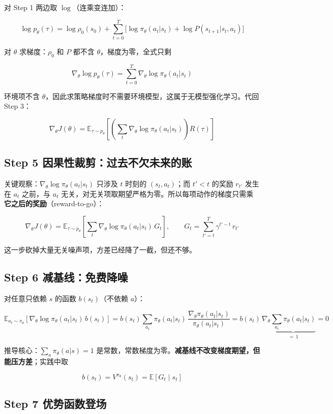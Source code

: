 \documentclass[UTF8,12pt,a4paper]{ctexrep}
\newcommand{\plain}[1]{\begin{plainbox}#1\end{plainbox}}
\begin{document}
对 Step 1 两边取 $\log$（连乘变连加）：

$$
\log p_\theta(\tau) = \log \rho_0(s_0) + \sum_{t=0}^{T}\Big[\log \pi_\theta(a_t|s_t) + \log P(s_{t+1}|s_t,a_t)\Big]
$$

对 $\theta$ 求梯度：$\rho_0$ 和 $P$ 都不含 $\theta$，梯度为零，全式只剩

$$
\nabla_\theta \log p_\theta(\tau) = \sum_{t=0}^{T} \nabla_\theta \log \pi_\theta(a_t|s_t)
$$

\plain{环境项不含 $\theta$，因此求策略梯度时不需要环境模型，这属于无模型强化学习。代回 Step 3：

$$
\nabla_\theta J(\theta) = \mathbb{E}_{\tau \sim p_\theta}\left[\left(\sum_{t} \nabla_\theta \log \pi_\theta(a_t|s_t)\right) R(\tau)\right]
$$}

\subsection*{Step 5 \; 因果性裁剪：过去不欠未来的账}

关键观察：$\nabla_\theta \log \pi_\theta(a_t|s_t)$ 只涉及 $t$ 时刻的 $(s_t,a_t)$；而 $t' < t$ 的奖励 $r_{t'}$ 发生在 $a_t$ 之前，与 $a_t$ 无关，对无关项取期望严格为零。所以每项动作的梯度只需乘\textbf{它之后的奖励}（reward-to-go）：

$$
\nabla_\theta J(\theta) = \mathbb{E}_{\tau \sim p_\theta}\left[\sum_{t} \nabla_\theta \log \pi_\theta(a_t|s_t)\, G_t\right],
\qquad
G_t = \sum_{t'=t}^{T} \gamma^{t'-t}\, r_{t'}
$$

这一步砍掉大量无关噪声项，方差已经降了一截，但还不够。

\subsection*{Step 6 \; 减基线：免费降噪}

对任意只依赖 $s$ 的函数 $b(s_t)$（不依赖 $a$）：

$$
\mathbb{E}_{a_t \sim \pi_\theta}\left[\nabla_\theta \log \pi_\theta(a_t|s_t)\, b(s_t)\right]
= b(s_t) \sum_{a_t} \pi_\theta(a_t|s_t)\, \frac{\nabla_\theta \pi_\theta(a_t|s_t)}{\pi_\theta(a_t|s_t)}
= b(s_t)\, \nabla_\theta \underbrace{\sum_{a_t} \pi_\theta(a_t|s_t)}_{=\,1} = 0
$$

推导核心：$\sum_a \pi_\theta(a|s) = 1$ 是常数，常数梯度为零。\textbf{减基线不改变梯度期望，但能压方差}；实践中取

$$
b(s_t) = V^{\pi_\theta}(s_t) = \mathbb{E}\left[G_t \mid s_t\right]
$$

\subsection*{Step 7 \; 优势函数登场}
\end{document}
